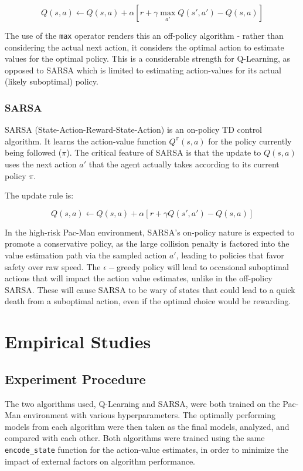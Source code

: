 \documentclass{article}
\begin{document}
$$Q(s,a)\leftarrow Q(s,a) + \alpha\left[r + \gamma \max_{a'}Q(s',a')-Q(s,a)\right]$$

The use of the \texttt{max} operator renders this an off-policy algorithm - rather than considering the actual next action, it considers the optimal action to estimate values for the optimal policy. This is a considerable strength for Q-Learning, as opposed to SARSA which is limited to estimating action-values for its actual (likely suboptimal) policy.

\subsubsection{SARSA}
SARSA (State-Action-Reward-State-Action) is an on-policy TD control algorithm. It learns the action-value function $Q^\pi(s, a)$ for the policy currently being followed ($\pi$). The critical feature of SARSA is that the update to $Q(s, a)$ uses the next action $a'$ that the agent actually takes according to its current policy $\pi$.

The update rule is:


$$Q(s, a) \leftarrow Q(s, a) + \alpha \left[ r + \gamma Q(s', a') - Q(s, a) \right]$$


In the high-risk Pac-Man environment, SARSA's on-policy nature is expected to promote a conservative policy, as the large collision penalty is factored into the value estimation path via the sampled action $a'$, leading to policies that favor safety over raw speed. The $\epsilon-$greedy policy will lead to occasional suboptimal actions that will impact the action value estimates, unlike in the off-policy SARSA. These will cause SARSA to be wary of states that could lead to a quick death from a suboptimal action, even if the optimal choice would be rewarding. 

\section{Empirical Studies}

\subsection{Experiment Procedure}
The two algorithms used, Q-Learning and SARSA, were both trained on the Pac-Man environment with various hyperparameters. The optimally performing models from each algorithm were then taken as the final models, analyzed, and compared with each other. Both algorithms were trained using the same \texttt{encode\_state} function for the action-value estimates, in order to minimize the impact of external factors on algorithm performance. 
\end{document}
